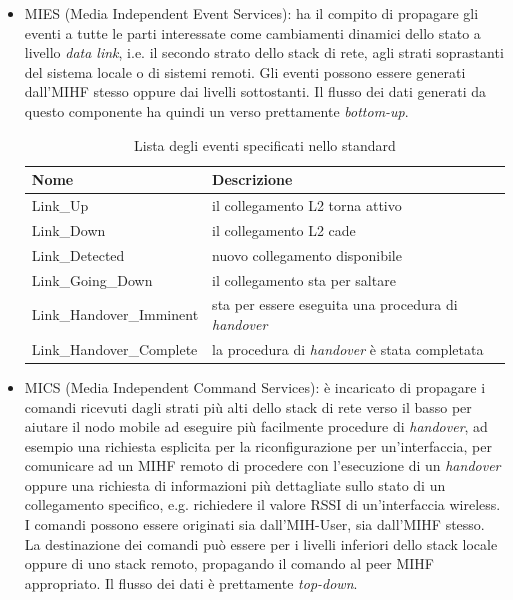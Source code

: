 \begin{itemize}
\item MIES (Media Independent Event Services): ha il compito di propagare gli eventi a tutte le parti interessate come cambiamenti dinamici dello stato a livello {\em data link}, i.e. il secondo strato dello stack di rete, agli strati soprastanti del sistema locale o di sistemi remoti. Gli eventi possono essere generati dall'MIHF stesso oppure dai livelli sottostanti. Il flusso dei dati generati da questo componente ha quindi un verso prettamente {\em bottom-up}.

\begin{table}[h]
\begin{tabular}{|p{}|p{}|}
\hline
Nome & Descrizione \\
\hline
\hline
Link\_Up & il collegamento L2 torna attivo \\
\hline
Link\_Down & il collegamento L2 cade  \\
\hline
Link\_Detected & nuovo collegamento disponibile \\
\hline
Link\_Going\_Down & il collegamento sta per saltare \\
\hline
Link\_Handover\_Imminent & sta per essere eseguita una procedura di {\em handover} \\
\hline
Link\_Handover\_Complete & la procedura di {\em handover} è stata completata \\
\hline
\end{tabular}
\caption{Lista degli eventi specificati nello standard}
\label{mihevents}
\end{table}

\item MICS (Media Independent Command Services): è incaricato di propagare i comandi ricevuti dagli strati più alti dello stack di rete verso il basso per aiutare il nodo mobile ad eseguire più facilmente procedure di {\em handover}, ad esempio una richiesta esplicita per la riconfigurazione per un'interfaccia, per comunicare ad un MIHF remoto di procedere con l'esecuzione di un {\em handover} oppure una richiesta di informazioni più dettagliate sullo stato di un collegamento specifico, e.g. richiedere il valore RSSI di un'interfaccia wireless. I comandi possono essere originati sia dall'MIH-User, sia dall'MIHF stesso. La destinazione dei comandi può essere per i livelli inferiori dello stack locale oppure di uno stack remoto, propagando il comando al peer MIHF appropriato. Il flusso dei dati è prettamente {\em top-down}.


\end{itemize}

